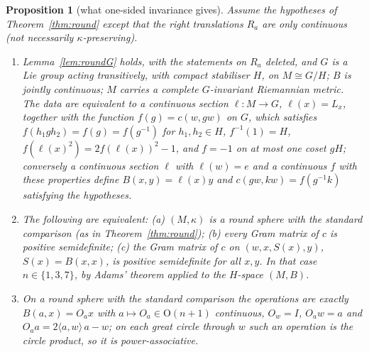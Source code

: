 \documentclass[11pt,reqno]{amsart}
\newtheorem{proposition}[theorem]{Proposition}
\theoremstyle{definition}
\theoremstyle{remark}
\numberwithin{equation}{section}
\newcommand{\ip}[2]{\langle #1,#2\rangle}
\newcommand{\OO}{\mathrm{O}}
\begin{document}
\begin{proposition}[what one-sided invariance gives]\label{prop:onesidedpos}
Assume the hypotheses of Theorem~\ref{thm:round} except that the right translations $R_a$ are only continuous (not necessarily
$\kappa$-preserving).
\begin{enumerate}[label=(\roman*)]
\item Lemma~\ref{lem:roundG} holds, with the statements on $R_a$ deleted, and $G$ is a Lie group acting transitively, with compact
stabiliser $H$, on $M\cong G/H$; $B$ is jointly continuous; $M$ carries a complete $G$-invariant Riemannian metric.  The data are
equivalent to a continuous section $\ell\colon M\to G$, $\ell(x)=L_x$, together with the function $f(g)=c(w,gw)$ on $G$, which satisfies
$f(h_1gh_2)=f(g)=f(g^{-1})$ for $h_1,h_2\in H$, $f^{-1}(1)=H$, $f(\ell(x)^2)=2f(\ell(x))^2-1$, and $f=-1$ on at most one coset $gH$; conversely a
continuous section $\ell$ with $\ell(w)=e$ and a continuous $f$ with these properties define $B(x,y)=\ell(x)y$ and $c(gw,kw)=f(g^{-1}k)$ satisfying the
hypotheses.
\item The following are equivalent: (a) $(M,\kappa)$ is a round sphere with the standard comparison (as in Theorem~\ref{thm:round});
(b) every Gram matrix of $c$ is positive semidefinite; (c) the Gram matrix of $c$ on $(w,x,S(x),y)$, $S(x)=B(x,x)$, is positive
semidefinite for all $x,y$.  In that case $n\in\{1,3,7\}$, by Adams' theorem \cite{Adams} applied to the $H$-space $(M,B)$.
\item On a round sphere with the standard comparison the operations are exactly $B(a,x)=O_ax$ with $a\mapsto O_a\in\OO(n+1)$ continuous,
$O_w=I$, $O_aw=a$ and $O_aa=2\ip aw\,a-w$; on each great circle through $w$ such an operation is the circle product, so it is
power-associative.
\end{enumerate}
\end{proposition}
\end{document}
